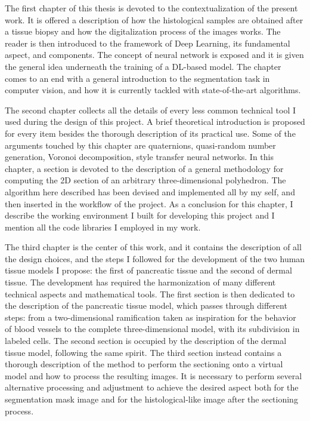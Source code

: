 The first chapter of this thesis is devoted to the contextualization of the present work. It is offered a description of how the histological samples are obtained after a tissue biopsy and how the digitalization process of the images works. The reader is then introduced to the framework of Deep Learning, its fundamental aspect, and components. The concept of neural network is exposed and it is given the general idea underneath the training of a DL-based model. The chapter comes to an end with a general introduction to the segmentation task in computer vision, and how it is currently tackled with state-of-the-art algorithms.

The second chapter collects all the details of every less common technical tool I used during the design of this project. A brief theoretical introduction is proposed for every item besides the thorough description of its practical use. Some of the arguments touched by this chapter are quaternions, quasi-random number generation, Voronoi decomposition, style transfer neural networks. In this chapter, a section is devoted to the description of a general methodology for computing the 2D section of an arbitrary three-dimensional polyhedron. The algorithm here described has been devised and implemented all by my self, and then inserted in the workflow of the project. As a conclusion for this chapter, I describe the working environment I built for developing this project and I mention all the code libraries I employed in my work.

The third chapter is the center of this work, and it contains the description of all the design choices, and the steps I followed for the development of the two human tissue models I propose: the first of pancreatic tissue and the second of dermal tissue. The development has required the harmonization of many different technical aspects and mathematical tools. The first section is then dedicated to the description of the pancreatic tissue model, which passes through different steps: from a two-dimensional ramification taken as inspiration for the behavior of blood vessels to the complete three-dimensional model, with its subdivision in labeled cells. The second section is occupied by the description of the dermal tissue model, following the same spirit. The third section instead contains a thorough description of the method to perform the sectioning onto a virtual model and how to process the resulting images. It is necessary to perform several alternative processing and adjustment to achieve the desired aspect both for the segmentation mask image and for the histological-like image after the sectioning process.

